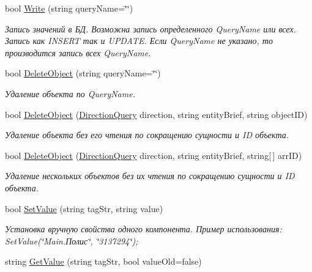 \begin{DoxyCompactItemize}
bool \mbox{\hyperlink{class_f_b_a_1_1_object_ref_a77b0e585d76fec2ba0e0dd6bada98e4f}{Write}} (string query\+Name=\char`\"{}\char`\"{})
\begin{DoxyCompactList}\small\item\em Запись значений в БД. Возможна запись определенного Query\+Name или всех. Запись как I\+N\+S\+E\+RT так и U\+P\+D\+A\+TE. Если Query\+Name не указано, то производится запись всех Query\+Name. \end{DoxyCompactList}\item 
bool \mbox{\hyperlink{class_f_b_a_1_1_object_ref_a43b293335c3d6c55581b02e4e525c2ae}{Delete\+Object}} (string query\+Name=\char`\"{}\char`\"{})
\begin{DoxyCompactList}\small\item\em Удаление объекта по Query\+Name. \end{DoxyCompactList}\item 
bool \mbox{\hyperlink{class_f_b_a_1_1_object_ref_a595fcc4c078298d10baf99be607b1f33}{Delete\+Object}} (\mbox{\hyperlink{namespace_f_b_a_a6ff7d5c242d98046d1980715b06d7300}{Direction\+Query}} direction, string entity\+Brief, string object\+ID)
\begin{DoxyCompactList}\small\item\em Удаление объекта без его чтения по сокращению сущности и ID объекта. \end{DoxyCompactList}\item 
bool \mbox{\hyperlink{class_f_b_a_1_1_object_ref_a1d210c88244aa2f032e2df8558d1fe26}{Delete\+Object}} (\mbox{\hyperlink{namespace_f_b_a_a6ff7d5c242d98046d1980715b06d7300}{Direction\+Query}} direction, string entity\+Brief, string\mbox{[}$\,$\mbox{]} arr\+ID)
\begin{DoxyCompactList}\small\item\em Удаление нескольких объектов без их чтения по сокращению сущности и ID объекта. \end{DoxyCompactList}\item 
bool \mbox{\hyperlink{class_f_b_a_1_1_object_ref_abb49524b064b9a2a9d899dd8d3dfcc2d}{Set\+Value}} (string tag\+Str, string value)
\begin{DoxyCompactList}\small\item\em Установка вручную свойства одного компонента. Пример использования\+: Set\+Value(\char`\"{}\+Main.\+Полис\char`\"{}, \char`\"{}3137294\char`\"{}); \end{DoxyCompactList}\item 
string \mbox{\hyperlink{class_f_b_a_1_1_object_ref_a6d626d17a5138978eade81bffca0e0eb}{Get\+Value}} (string tag\+Str, bool value\+Old=false)

\end{DoxyCompactItemize}
